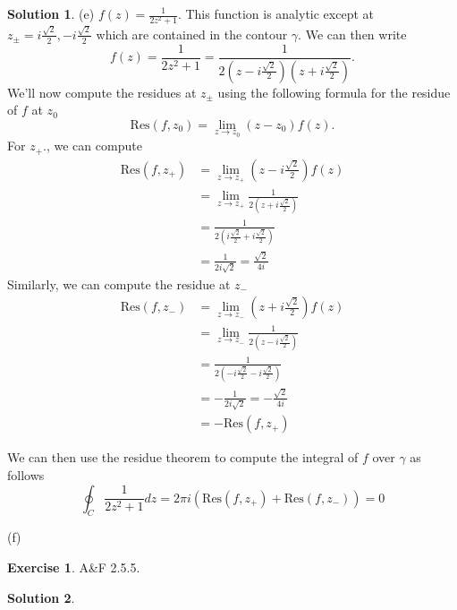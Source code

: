 \documentclass[12pt]{article}
\newcommand{\Res}{\text{Res}}
\theoremstyle{definition}
\newtheorem{exer}{Exercise}
\newtheorem{sol}{Solution}
\theoremstyle{remark}
\begin{document}
\begin{sol}
    (e) $f(z) = \frac{1}{2z^2+1}$. This function is analytic except at $z_{\pm} = i\frac{\sqrt{2}}{2}, - i\frac{\sqrt{2}}{2}$ which are contained in the contour $\gamma$. We can then write 
    \begin{equation}
        f(z) = \frac{1}{2z^2 + 1} = \frac{1}{2(z - i\frac{\sqrt{2}}{2})(z + i\frac{\sqrt{2}}{2})}.
    \end{equation}
    We'll now compute the residues at $z_{\pm}$ using the following formula for the residue of $f$ at $z_0$ 
    \begin{equation}
        \Res(f, z_0) = \lim\limits_{z\to z_0} (z-z_0)f(z).
    \end{equation}
    For $z_{+}$., we can compute
    \begin{align}
        \Res(f,z_{+}) &= \lim\limits_{z\to z_+} \left(z - i\frac{\sqrt{2}}{2} \right)f(z)\\ 
                      &= \lim\limits_{z\to z_+} \frac{1}{2(z + i\frac{\sqrt{2}}{2})} \\
                      &= \frac{1}{2 \left(i\frac{\sqrt{2}}{2} + i\frac{\sqrt{2}}{2} \right)}\\
                      &= \frac{1}{2i\sqrt{2}} = \frac{\sqrt{2}}{4i}
    \end{align}
    Similarly, we can compute the residue at $z_{-}$
    \begin{align}
        \Res(f,z_{-}) &= \lim\limits_{z\to z_-} \left(z + i\frac{\sqrt{2}}{2} \right)f(z)\\ 
                      &= \lim\limits_{z\to z_-} \frac{1}{2(z - i\frac{\sqrt{2}}{2})} \\
                      &= \frac{1}{2 \left(-i\frac{\sqrt{2}}{2} - i\frac{\sqrt{2}}{2} \right)}\\
                      &= -\frac{1}{2i\sqrt{2}} = -\frac{\sqrt{2}}{4i}\\
                      &=  -\Res(f,z_{+}) 
    \end{align}

    We can then use the residue theorem to compute the integral of $f$ over $\gamma$ as follows
    \begin{equation}
        \oint_C \frac{1}{2z^2+1} dz = 2\pi i \left(  \Res(f,z_{+}) +   \Res(f,z_{-})    \right) = 0
    \end{equation}

    (f)
\end{sol}

\newpage

\begin{exer}
    A\&F 2.5.5.
\end{exer}
\begin{sol}

\end{sol}
\end{document}
